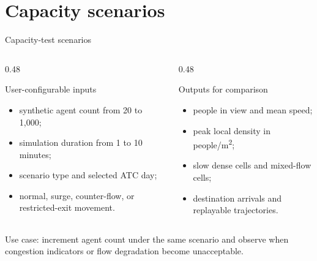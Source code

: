 \documentclass[aspectratio=169]{beamer}
\begin{document}
\section{Capacity scenarios}
\begin{frame}{Capacity-test scenarios}
\begin{columns}[T]
\begin{column}{0.48\textwidth}
\begin{block}{User-configurable inputs}
\begin{itemize}
\item synthetic agent count from 20 to 1,000;
\item simulation duration from 1 to 10 minutes;
\item scenario type and selected ATC day;
\item normal, surge, counter-flow, or restricted-exit movement.
\end{itemize}
\end{block}
\end{column}
\begin{column}{0.48\textwidth}
\begin{block}{Outputs for comparison}
\begin{itemize}
\item people in view and mean speed;
\item peak local density in people/m\textsuperscript{2};
\item slow dense cells and mixed-flow cells;
\item destination arrivals and replayable trajectories.
\end{itemize}
\end{block}
\end{column}
\end{columns}
\vspace{0.22cm}
\alert{Use case:} increment agent count under the same scenario and observe when congestion indicators or flow degradation become unacceptable.
\end{frame}
\end{document}
